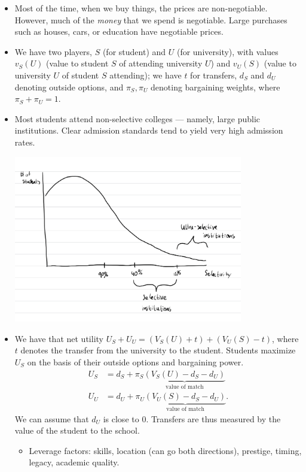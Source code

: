 \documentclass[10pt]{extarticle}
\begin{document}
\begin{itemize}
    \item Most of the time, when we buy things, the prices are non-negotiable. However, much of the \textit{money} that we spend is negotiable. Large purchases such as houses, cars, or education have negotiable prices.
    \item We have two players, $S$ (for student) and $U$ (for university), with values $v_S(U)$ (value to student $S$ of attending university $U$) and $v_U(S)$ (value to university $U$ of student $S$ attending); we have $t$ for transfers, $d_S$ and $d_U$ denoting outside options, and $\pi_S,\pi_U$ denoting bargaining weights, where $\pi_S + \pi_U = 1$.
    \item Most students attend non-selective colleges --- namely, large public institutions. Clear admission standards tend to yield very high admission rates.
      \begin{center}
        \includegraphics[width=10cm]{images/selectivity_and_enrollment.jpeg}
      \end{center}
    \item We have that net utility $U_S + U_U = (V_S(U) + t) + (V_U(S) - t)$, where $t$ denotes the transfer from the university to the student. Students maximize $U_S$ on the basis of their outside options and bargaining power.
      \begin{align*}
        U_S &= d_S + \pi_S\underbrace{(V_S(U) - d_S - d_U)}_{\text{value of match}}\\
        U_U &= d_U + \pi_U\underbrace{(V_U(S) - d_S - d_U)}_{\text{value of match}}.
      \end{align*}
      We can assume that $d_U$ is close to $0$. Transfers are thus measured by the value of the student to the school.
      \begin{itemize}
        \item Leverage factors: skills, location (can go both directions), prestige, timing, legacy, academic quality.

\end{itemize}
\end{itemize}
\end{document}
